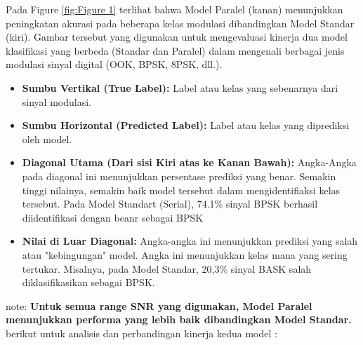 \documentclass{article}
\begin{document}
Pada Figure \ref{fig:Figure 1} terlihat bahwa Model Paralel (kanan) menunjukkan peningkatan akurasi pada beberapa kelas modulasi 
dibandingkan Model Standar (kiri). Gambar tersebut yang digunakan untuk mengevaluasi kinerja dua model klasifikasi yang berbeda 
(Standar dan Paralel) dalam mengenali berbagai jenis modulasi sinyal digital (OOK, BPSK, 8PSK, dll.).

\begin{itemize}
    \item \textbf{Sumbu Vertikal (True Label):} Label atau kelas yang sebenarnya dari sinyal modulasi. 
    \item \textbf{Sumbu Horizontal (Predicted Label):} Label atau kelas yang diprediksi oleh model.
    \item \textbf{Diagonal Utama (Dari sisi Kiri atas ke Kanan Bawah):} Angka-Angka pada diagonal ini menunjukkan persentase prediksi yang benar. Semakin tinggi nilainya,
    semakin baik model tersebut dalam mengidentifiaksi kelas tersebut. Pada Model Standart (Serial), 74.1\% sinyal BPSK berhasil diidentifikasi dengan beanr sebagai BPSK
    \item \textbf{Nilai di Luar Diagonal:} Angka-angka ini menunjukkan prediksi yang salah atau "kebingungan" model. Angka ini menunjukkan kelas mana yang sering tertukar. Misalnya, pada Model Standar, 20,3\% sinyal BASK salah diklasifikasikan sebagai BPSK.
\end{itemize} 
note: \textbf{Untuk semua range SNR yang digunakan, Model Paralel menunjukkan performa yang lebih baik dibandingkan Model Standar.} 
berikut untuk analisis dan perbandingan kinerja kedua model :
\end{document}
